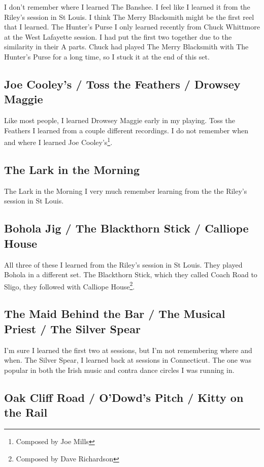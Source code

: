 \documentclass[9pt,letterpaper]{article}
\begin{document}
{I don't remember where I learned The Banshee. I feel like I learned it from the Riley's session in St Louis. I think The Merry Blacksmith might be the first reel that I learned. The Hunter's Purse I only learned recently from Chuck Whittmore at the West Lafayette session. I had put the first two together due to the similarity in their A parts. Chuck had played The Merry Blacksmith with The Hunter's Purse for a long time, so I stuck it at the end of this set.

\subsection{Joe Cooley's / Toss the Feathers / Drowsey Maggie}

Like most people, I learned Drowsey Maggie early in my playing. Toss the Feathers I learned from a couple different recordings. I do not remember when and where I learned Joe Cooley's\footnote{Composed by Joe Mills}.

\subsection{The Lark in the Morning}

The Lark in the Morning I very much remember learning from the the Riley's session in St Louis.

\subsection{Bohola Jig / The Blackthorn Stick / Calliope House}

All three of these I learned from the Riley's session in St Louis. They played Bohola in a different set. The Blackthorn Stick, which they called Coach Road to Sligo, they followed with Calliope House\footnote{Composed by Dave Richardson}.

\subsection{The Maid Behind the Bar / The Musical Priest / The Silver Spear}

I'm sure I learned the first two at sessions, but I'm not remembering where and when. The Silver Spear, I learned back at sessions in Connecticut. The one was popular in both the Irish music and contra dance circles I was running in.

\subsection{Oak Cliff Road / O'Dowd's Pitch / Kitty on the Rail}

}
\end{document}
